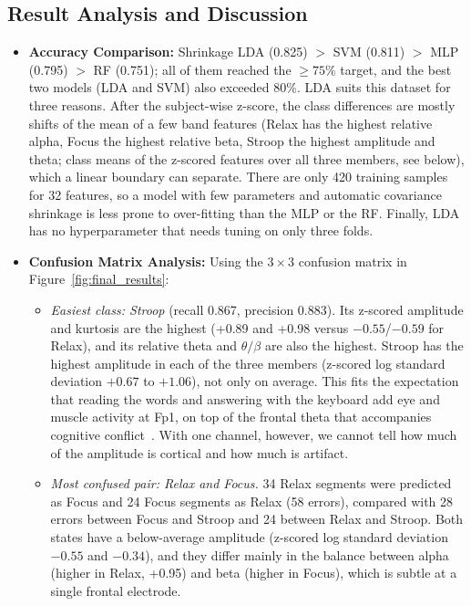 \subsection{Result Analysis and Discussion}
\begin{itemize}[leftmargin=*]
    \item \textbf{Accuracy Comparison:} Shrinkage LDA (0.825) $>$ SVM (0.811) $>$ MLP (0.795) $>$ RF (0.751); all of them reached the $\geq 75\%$ target, and the best two models (LDA and SVM) also exceeded 80\%. LDA suits this dataset for three reasons. After the subject-wise z-score, the class differences are mostly shifts of the mean of a few band features (Relax has the highest relative alpha, Focus the highest relative beta, Stroop the highest amplitude and theta; class means of the z-scored features over all three members, see below), which a linear boundary can separate. There are only 420 training samples for 32 features, so a model with few parameters and automatic covariance shrinkage is less prone to over-fitting than the MLP or the RF. Finally, LDA has no hyperparameter that needs tuning on only three folds.
    \item \textbf{Confusion Matrix Analysis:} Using the $3 \times 3$ confusion matrix in Figure~\ref{fig:final_results}:
    \begin{itemize}
        \item \emph{Easiest class: Stroop} (recall 0.867, precision 0.883). Its z-scored amplitude and kurtosis are the highest (+0.89 and +0.98 versus $-0.55$/$-0.59$ for Relax), and its relative theta and $\theta/\beta$ are also the highest. Stroop has the highest amplitude in each of the three members (z-scored log standard deviation $+0.67$ to $+1.06$), not only on average. This fits the expectation that reading the words and answering with the keyboard add eye and muscle activity at Fp1, on top of the frontal theta that accompanies cognitive conflict~\cite{cavanagh2014}. With one channel, however, we cannot tell how much of the amplitude is cortical and how much is artifact.
        \item \emph{Most confused pair: Relax and Focus.} 34 Relax segments were predicted as Focus and 24 Focus segments as Relax (58 errors), compared with 28 errors between Focus and Stroop and 24 between Relax and Stroop. Both states have a below-average amplitude (z-scored log standard deviation $-0.55$ and $-0.34$), and they differ mainly in the balance between alpha (higher in Relax, +0.95) and beta (higher in Focus), which is subtle at a single frontal electrode.

\end{itemize}
\end{itemize}
